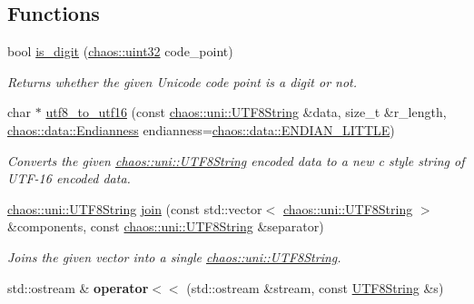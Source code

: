 \subsection*{Functions}
\begin{DoxyCompactItemize}
\item 
bool \hyperlink{namespacechaos_1_1uni_a25a7549a0378aeac227c881220c23640}{is\-\_\-digit} (\hyperlink{namespacechaos_a3b3a47ba1e284655bf1a30c441121c60}{chaos\-::uint32} code\-\_\-point)
\begin{DoxyCompactList}\small\item\em Returns whether the given Unicode code point is a digit or not. \end{DoxyCompactList}\item 
char $\ast$ \hyperlink{namespacechaos_1_1uni_ae9ad4c8b653b2202e908fec0dce094e7}{utf8\-\_\-to\-\_\-utf16} (const \hyperlink{classchaos_1_1uni_1_1_u_t_f8_string}{chaos\-::uni\-::\-U\-T\-F8\-String} \&data, size\-\_\-t \&r\-\_\-length, \hyperlink{namespacechaos_1_1data_adb2657d50c0b84cdc1153001031bbf3f}{chaos\-::data\-::\-Endianness} endianness=\hyperlink{namespacechaos_1_1data_adb2657d50c0b84cdc1153001031bbf3fa7fc5455bb6147c278dfa4a84e255c66d}{chaos\-::data\-::\-E\-N\-D\-I\-A\-N\-\_\-\-L\-I\-T\-T\-L\-E})
\begin{DoxyCompactList}\small\item\em Converts the given \hyperlink{classchaos_1_1uni_1_1_u_t_f8_string}{chaos\-::uni\-::\-U\-T\-F8\-String} encoded data to a new c style string of U\-T\-F-\/16 encoded data. \end{DoxyCompactList}\item 
\hyperlink{classchaos_1_1uni_1_1_u_t_f8_string}{chaos\-::uni\-::\-U\-T\-F8\-String} \hyperlink{namespacechaos_1_1uni_ad2a77983423c8b10e2b18cae6f35d329}{join} (const std\-::vector$<$ \hyperlink{classchaos_1_1uni_1_1_u_t_f8_string}{chaos\-::uni\-::\-U\-T\-F8\-String} $>$ \&components, const \hyperlink{classchaos_1_1uni_1_1_u_t_f8_string}{chaos\-::uni\-::\-U\-T\-F8\-String} \&separator)
\begin{DoxyCompactList}\small\item\em Joins the given vector into a single \hyperlink{classchaos_1_1uni_1_1_u_t_f8_string}{chaos\-::uni\-::\-U\-T\-F8\-String}. \end{DoxyCompactList}\item 
\hypertarget{namespacechaos_1_1uni_ab20a8223562ec1ee8f663bda07c7a3ad}{std\-::ostream \& {\bfseries operator$<$$<$} (std\-::ostream \&stream, const \hyperlink{classchaos_1_1uni_1_1_u_t_f8_string}{U\-T\-F8\-String} \&s)}\label{namespacechaos_1_1uni_ab20a8223562ec1ee8f663bda07c7a3ad}

\end{DoxyCompactItemize}



